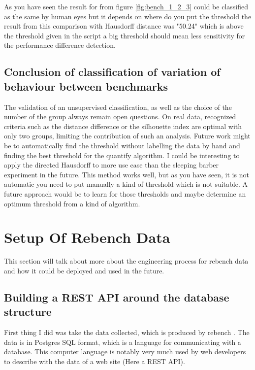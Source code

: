 \documentclass{article}
\begin{document}
As you have seen the result for from figure \ref{fig:bench_1_2_3} could be classified as the same by human eyes but it depends on where do you put the threshold the result from this comparison with Hausdorff distance was "50.24" which is above the threshold given in the script a big threshold should mean less sensitivity for the performance difference detection.\\

\pagebreak
\newpage


\subsection{Conclusion of classification of variation of behaviour between benchmarks}

The validation of an unsupervised classification, as well as the choice of the number of the group always remain open questions. On real data, recognized criteria such as the distance difference or the silhouette index are optimal with only two groups, limiting the contribution of such an analysis.
Future work might be to automatically find the threshold without labelling the data by hand and finding the best threshold for the quantify algorithm.
I could be interesting to apply the directed Hausdorff to more use case than the sleeping barber experiment in the future.
This method works well, but as you have seen, it is not automatic you need to put manually a kind of threshold which is not suitable.
A future approach would be to learn for those thresholds and maybe determine an optimum threshold from a kind of algorithm.



\section{Setup Of Rebench Data}
This section will talk about more about the engineering process for rebench data and how it could be deployed and used in the future.\\

\subsection{Building a REST API around the database structure}

First thing I did was take the data collected, which is produced by rebench \citep{ReBench:2018}. The data is in Postgres SQL format, which is a language for communicating with a database. This computer language is notably very much used by web developers to describe with the data of a web site (Here a REST API).
\end{document}
